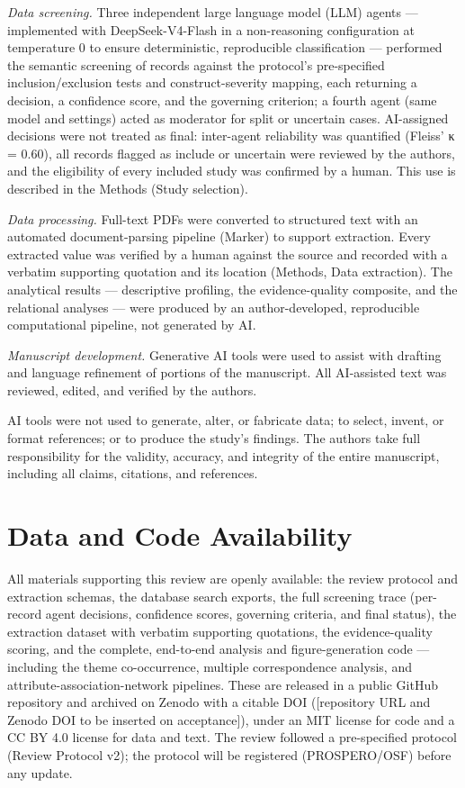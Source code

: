 \emph{Data screening.} Three independent large language model (LLM) agents --- implemented
with DeepSeek-V4-Flash in a non-reasoning configuration at temperature 0 to ensure
deterministic, reproducible classification --- performed the semantic screening of
records against the protocol's pre-specified inclusion/exclusion tests and
construct-severity mapping, each returning a decision, a confidence score, and the
governing criterion; a fourth agent (same model and settings) acted as moderator
for split or uncertain cases. AI-assigned decisions were not treated as final:
inter-agent reliability was quantified (Fleiss' κ = 0.60), all records flagged as
include or uncertain were reviewed by the authors, and the eligibility of every
included study was confirmed by a human. This use is described in the Methods
(Study selection).

\emph{Data processing.} Full-text PDFs were converted to structured text with an
automated document-parsing pipeline (Marker) to support extraction. Every
extracted value was verified by a human against the source and recorded with a
verbatim supporting quotation and its location (Methods, Data extraction). The
analytical results --- descriptive profiling, the evidence-quality composite, and
the relational analyses --- were produced by an author-developed, reproducible
computational pipeline, not generated by AI.

\emph{Manuscript development.} Generative AI tools were used to assist with drafting
and language refinement of portions of the manuscript. All AI-assisted text was
reviewed, edited, and verified by the authors.

AI tools were not used to generate, alter, or fabricate data; to select,
invent, or format references; or to produce the study's findings. The authors
take full responsibility for the validity, accuracy, and integrity of the entire
manuscript, including all claims, citations, and references.

\section{Data and Code Availability}\label{data-and-code-availability}

All materials supporting this review are openly available: the review protocol and
extraction schemas, the database search exports, the full screening trace
(per-record agent decisions, confidence scores, governing criteria, and final
status), the extraction dataset with verbatim supporting quotations, the
evidence-quality scoring, and the complete, end-to-end analysis and
figure-generation code --- including the theme co-occurrence, multiple correspondence
analysis, and attribute-association-network pipelines. These are released in a
public GitHub repository and archived on Zenodo with a citable DOI ({[}repository URL
and Zenodo DOI to be inserted on acceptance{]}), under an MIT license for code and a
CC BY 4.0 license for data and text. The review followed a pre-specified protocol
(Review Protocol v2); the protocol will be registered (PROSPERO/OSF) before any
update.
